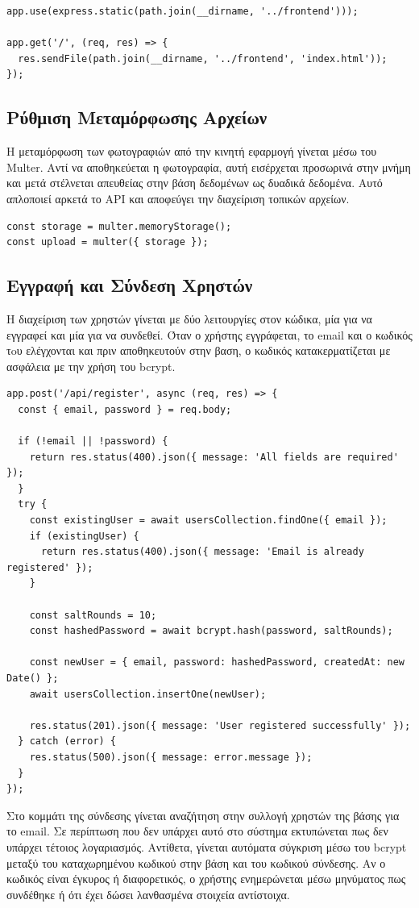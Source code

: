 \begin{lstlisting}
app.use(express.static(path.join(__dirname, '../frontend')));

app.get('/', (req, res) => {
  res.sendFile(path.join(__dirname, '../frontend', 'index.html'));
});
\end{lstlisting}

\subsection{Ρύθμιση Μεταμόρφωσης Αρχείων}
Η μεταμόρφωση των φωτογραφιών από την κινητή εφαρμογή γίνεται μέσω του Multer. Αντί να αποθηκεύεται η φωτογραφία, αυτή εισέρχεται προσωρινά στην μνήμη και μετά στέλνεται απευθείας στην βάση δεδομένων ως δυαδικά δεδομένα. Αυτό απλοποιεί αρκετά το API και αποφεύγει την διαχείριση τοπικών αρχείων.
\\

\begin{lstlisting}
const storage = multer.memoryStorage();
const upload = multer({ storage });
\end{lstlisting}

\subsection{Εγγραφή και Σύνδεση Χρηστών}
Η διαχείριση των χρηστών γίνεται με δύο λειτουργίες στον κώδικα, μία για να εγγραφεί και μία για να συνδεθεί. Όταν ο χρήστης εγγράφεται, το email και ο κωδικός τoυ ελέγχονται και πριν αποθηκευτούν στην βαση, ο κωδικός κατακερματίζεται με ασφάλεια με την χρήση του bcrypt.
\\

\begin{lstlisting}
app.post('/api/register', async (req, res) => {
  const { email, password } = req.body;

  if (!email || !password) {
    return res.status(400).json({ message: 'All fields are required' });
  }
  try {
    const existingUser = await usersCollection.findOne({ email });
    if (existingUser) {
      return res.status(400).json({ message: 'Email is already registered' });
    }

    const saltRounds = 10;
    const hashedPassword = await bcrypt.hash(password, saltRounds);

    const newUser = { email, password: hashedPassword, createdAt: new Date() };
    await usersCollection.insertOne(newUser);

    res.status(201).json({ message: 'User registered successfully' });
  } catch (error) {
    res.status(500).json({ message: error.message });
  }
});
\end{lstlisting}
\vspace{\baselineskip}
Στο κομμάτι της σύνδεσης γίνεται αναζήτηση στην συλλογή χρηστών της βάσης για το email. Σε περίπτωση που δεν υπάρχει αυτό στο σύστημα εκτυπώνεται πως δεν υπάρχει τέτοιος λογαριασμός. Αντίθετα, γίνεται αυτόματα σύγκριση μέσω του bcrypt μεταξύ του καταχωρημένου κωδικού στην βάση και του κωδικού σύνδεσης. Αν ο κωδικός είναι έγκυρος ή διαφορετικός, ο χρήστης ενημερώνεται μέσω μηνύματος πως συνδέθηκε ή ότι έχει δώσει λανθασμένα στοιχεία αντίστοιχα.
\\


